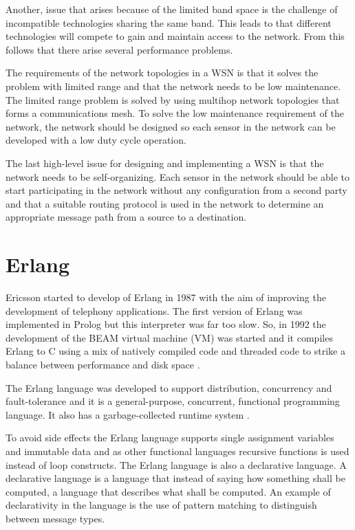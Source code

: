 Another, issue that arises because of the limited band space is the challenge of incompatible technologies sharing the same band. This leads to that different technologies will compete to gain and maintain access to the network. From this follows that there arise several performance problems.

The requirements of the network topologies in a WSN is that it solves the problem with limited range and that the network needs to be low maintenance. The limited range problem is solved by using multihop network topologies that forms a communications mesh. To solve the low maintenance requirement of the network, the network should be designed so each sensor in the network can be developed with a low duty cycle operation.

The last high-level issue for designing and implementing a WSN is that the network needs to be self-organizing. Each sensor in the network should be able to start participating in the network without any configuration from a second party and that a suitable routing protocol is used in the network to determine an appropriate message path from a source to a destination.


\section{Erlang}
Ericsson started to develop of Erlang in 1987 with the aim of improving the development of telephony applications. The first version of Erlang was implemented in Prolog but this interpreter was far too slow. So, in 1992 the development of the BEAM virtual machine (VM) was started and it compiles Erlang to C using a mix of natively compiled code and threaded code to strike a balance between performance and disk space \citep{armstrong1997development}.

The Erlang language was developed to support distribution, concurrency and fault-tolerance and it is a general-purpose, concurrent, functional programming language. It also has a garbage-collected runtime system \citep{armstrong1996erlang}. 

To avoid side effects the Erlang language supports single assignment variables and immutable data and as other functional languages recursive functions is used instead of loop constructs. The Erlang language is also a declarative language. A declarative language is a language that instead of saying how something shall be computed, a language that describes what shall be computed. An example of declarativity in the language is the use of pattern matching to distinguish between message types. 

